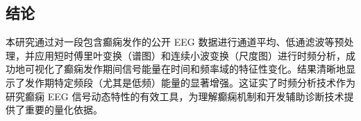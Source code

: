 \documentclass{article}
\providecommand{\pcsync}{\par\vspace{\baselineskip}} %
\begin{document}
\begin{paracol}{2}
\switchcolumn %

\section{结论}
\pcsync

本研究通过对一段包含癫痫发作的公开 EEG 数据进行通道平均、低通滤波等预处理，并应用短时傅里叶变换（谱图）和连续小波变换（尺度图）进行时频分析，成功地可视化了癫痫发作期间信号能量在时间和频率域的特征性变化。结果清晰地显示了发作期特定频段（尤其是低频）能量的显著增强。这证实了时频分析技术作为研究癫痫 EEG 信号动态特性的有效工具，为理解癫痫机制和开发辅助诊断技术提供了重要的量化依据。
\switchcolumn* %

\end{paracol} %

\balance %

\end{document}

